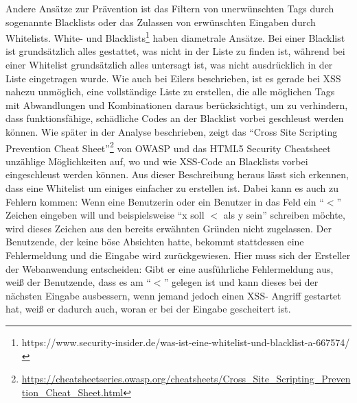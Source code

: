 Andere Ansätze zur Prävention ist das Filtern von unerwünschten Tags durch sogenannte Blacklists oder das Zulassen von erwünschten Eingaben durch Whitelists. White- und Blacklists\footnote{https://www.security-insider.de/was-ist-eine-whitelist-und-blacklist-a-667574/} haben diametrale Ansätze. Bei einer Blacklist ist grundsätzlich alles gestattet, was nicht in der Liste zu finden ist, während bei einer Whitelist grundsätzlich alles untersagt ist, was nicht ausdrücklich in der Liste eingetragen wurde.
Wie auch bei Eilers beschrieben, ist es gerade bei XSS nahezu unmöglich, eine vollständige Liste zu erstellen, die alle möglichen Tags mit Abwandlungen und Kombinationen daraus berücksichtigt, um zu verhindern, dass funktionsfähige, schädliche Codes an der Blacklist vorbei geschleust werden können. Wie später in der Analyse beschrieben, zeigt das ``Cross Site Scripting Prevention Cheat Sheet''\footnote{\url{https://cheatsheetseries.owasp.org/cheatsheets/Cross_Site_Scripting_Prevention_Cheat_Sheet.html}} von OWASP und das HTML5 Security Cheatsheet unzählige Möglichkeiten auf, wo und wie XSS-Code an Blacklists vorbei eingeschleust werden können.
Aus dieser Beschreibung heraus lässt sich erkennen, dass eine Whitelist um einiges einfacher zu erstellen ist.  Dabei kann es auch zu Fehlern kommen: Wenn eine Benutzerin oder ein Benutzer in das Feld ein ``$<$'' Zeichen eingeben will und beispielsweise ``x soll $<$ als y sein'' schreiben möchte, wird dieses Zeichen aus den bereits erwähnten Gründen nicht zugelassen. Der Benutzende, der keine böse Absichten hatte, bekommt stattdessen eine Fehlermeldung und die Eingabe wird zurückgewiesen.  Hier muss sich der Ersteller der Webanwendung entscheiden: Gibt er eine ausführliche Fehlermeldung aus, weiß der Benutzende, dass es am ``$<$'' gelegen ist und kann dieses bei der nächsten Eingabe ausbessern,  wenn  jemand jedoch einen XSS- Angriff gestartet hat, weiß er dadurch auch, woran er bei der Eingabe gescheitert ist.
